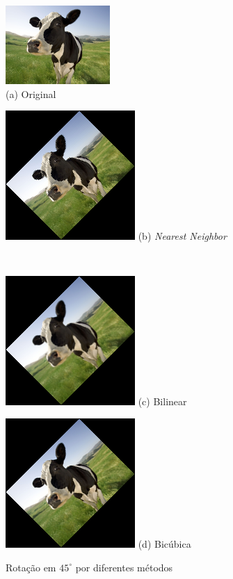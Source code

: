 \documentclass[12pt]{article}
\begin{document}
\begin{figure}[H]
    \begin{minipage}{.45\textwidth}
        \centering
        \includegraphics{cow_very_small}
        \\
        (a) Original
    \end{minipage}%
    \begin{minipage}{.45\textwidth}
        \centering
        \includegraphics{cow_nearest_rotated}
        (b) \textit{Nearest Neighbor}
    \end{minipage}
    \\
    \begin{minipage}{.45\textwidth}
        \centering
        \includegraphics{cow_bilinear_rotated}
        (c) Bilinear
    \end{minipage}%
    \begin{minipage}{.45\textwidth}
        \centering
        \includegraphics{cow_cubic_rotated}
        (d) Bicúbica
    \end{minipage}
    \caption{Rotação em $45^{\circ}$ por diferentes métodos}
    \label{fig:vaca:rotacao}
\end{figure}
\end{document}
